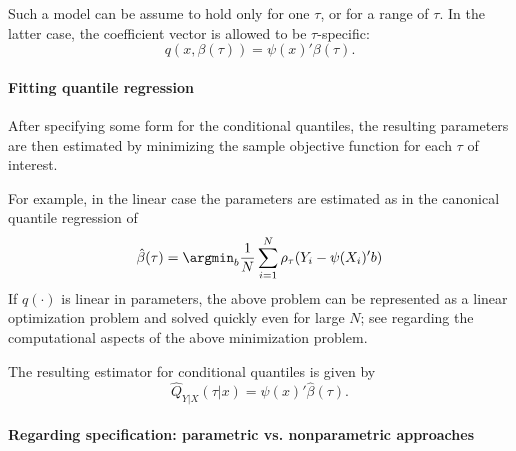 Such a model can be assume to hold only for one $\tau$, or for a range of $\tau$. In the latter case, the coefficient vector is allowed to be $\tau$-specific:
\begin{equation}\label{causal:equation:linear_quantile_specific}
	q(x, \beta(\tau)) = \psi(x)'\beta(\tau). 
\end{equation}

\paragraph{Fitting quantile regression}

After specifying some form for the conditional quantiles, the resulting parameters are then estimated by minimizing the sample objective function for each $\tau$ of interest.

 For example, in the linear case the parameters are estimated as in the canonical quantile regression of \cite{Koenker1978RegressionQuantiles}
\begin{equation}
	\hat{\beta}(\tau)= \argmin_{b} \dfrac{1}{N}\sum_{i=1}^N \rho_{\tau}(Y_i-\psi(X_i)'b)
\end{equation} 
If $q(\cdot)$ is linear in parameters, the above problem can be represented as a linear optimization problem and solved quickly even for large $N$; see \cite{Koenker2017ComputationalMethodsQuantile} regarding the computational aspects of the above minimization problem.


The resulting estimator for conditional quantiles is given by
\begin{equation}
	 \hat{Q}_{Y|X}(\tau|x) = \psi(x)'\hat{\beta}(\tau).
\end{equation}



\paragraph{Regarding specification: parametric vs. nonparametric approaches}

 
